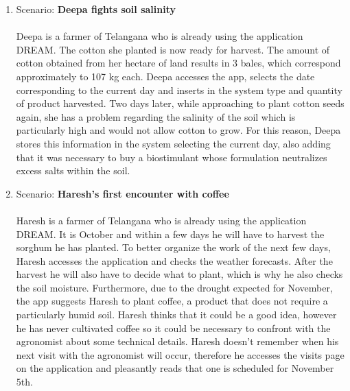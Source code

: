 \begin{enumerate}
\item Scenario: \textbf{Deepa fights soil salinity}\\\\
Deepa is a farmer of Telangana who is already using the application DREAM. The cotton she planted is now ready for harvest. The amount of cotton obtained from her hectare of land results in 3 bales, which correspond approximately to 107 kg each. Deepa accesses the app, selects the date corresponding to the current day and inserts in the system type and quantity of product harvested. Two days later, while approaching to plant cotton seeds again, she has a problem regarding the salinity of the soil which is particularly high and would not allow cotton to grow. For this reason, Deepa stores this information in the system selecting the current day, also adding that it was necessary to buy a biostimulant whose formulation neutralizes excess salts within the soil.
\\

\item Scenario: \textbf{Haresh's first encounter with coffee}\\\\
Haresh is a farmer of Telangana who is already using the application DREAM. It is October and within a few days he will have to harvest the sorghum he has planted. To better organize the work of the next few days, Haresh accesses the application and checks the weather forecasts. After the harvest he will also have to decide what to plant, which is why he also checks the soil moisture. Furthermore, due to the drought expected for November, the app suggests Haresh to plant coffee, a product that does not require a particularly humid soil. Haresh thinks that it could be a good idea, however he has never cultivated coffee so it could be necessary to confront with the agronomist about some technical details. Haresh doesn't remember when his next visit with the agronomist will occur, therefore he accesses the visits page on the application and pleasantly reads that one is scheduled for November 5th.
\\


\end{enumerate}
